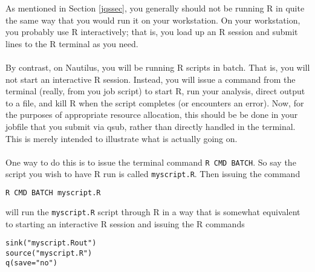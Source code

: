 As mentioned in Section \ref{jqssec}, you generally should not be running R in quite the same way that you would run it on your workstation.  On your workstation, you probably use R interactively; that is, you load up an R session and submit lines to the R terminal as you need. \\\\
%
By contrast, on Nautilus, you will be running R scripts in batch.  That is, you will not start an interactive R session.  Instead, you will issue a command from the terminal (really, from you job script) to start R, run your analysis, direct output to a file, and kill R when the script completes (or encounters an error).  Now, for the purposes of appropriate resource allocation, this should be be done in your jobfile that you submit via qsub, rather than directly handled in the terminal.  This is merely intended to illustrate what is actually going on.  \\\\
%
One way to do this is to issue the terminal command \texttt{R CMD BATCH}.  So say the script you wish to have R run is called \texttt{myscript.R}.  Then issuing the command
\begin{lstlisting}[language=sh]
R CMD BATCH myscript.R 
\end{lstlisting}%
will run the \texttt{myscript.R} script through R in a way that is somewhat equivalent to starting an interactive R session and issuing the R commands 
\begin{lstlisting}[language=rr]
sink("myscript.Rout")
source("myscript.R")
q(save="no")
\end{lstlisting}

